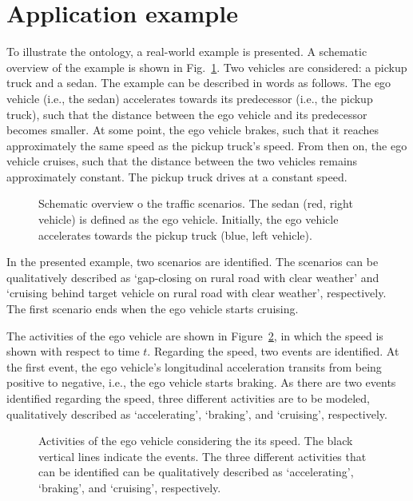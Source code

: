 \section{Application example}
\label{sec:example}

To illustrate the ontology, a real-world example is presented. A schematic overview of the example is shown in Fig.~\ref{fig:example schematic}. Two vehicles are considered: a pickup truck and a sedan. The example can be described in words as follows. The ego vehicle (i.e., the sedan) accelerates towards its predecessor (i.e., the pickup truck), such that the distance between the ego vehicle and its predecessor becomes smaller. At some point, the ego vehicle brakes, such that it reaches approximately the same speed as the pickup truck's speed. From then on, the ego vehicle cruises, such that the distance between the two vehicles remains approximately constant. The pickup truck drives at a constant speed.

\begin{figure}
	\centering
	\setlength\figureheight{121pt}
	\setlength\figurewidth{260pt}
	
	\caption{Schematic overview o the traffic scenarios. The sedan (red, right vehicle) is defined as the ego vehicle. Initially, the ego vehicle accelerates towards the pickup truck (blue, left vehicle).}
	\label{fig:example schematic}
\end{figure}

In the presented example, two scenarios are identified. The scenarios can be qualitatively described as `gap-closing on rural road with clear weather' and `cruising behind target vehicle on rural road with clear weather', respectively. The first scenario ends when the ego vehicle starts cruising. 

The activities of the ego vehicle are shown in Figure~\ref{fig:example ego states}, in which the speed is shown with respect to time $t$. Regarding the speed, two events are identified. At the first event, the ego vehicle's longitudinal acceleration transits from being positive to negative, i.e., the ego vehicle starts braking. As there are two events identified regarding the speed, three different activities are to be modeled, qualitatively described as `accelerating', `braking', and `cruising', respectively. 

\begin{figure}
	\centering
	\setlength\figureheight{130pt}
	\setlength\figurewidth{248pt}
	
	\caption{Activities of the ego vehicle considering the its speed. The black vertical lines indicate the events. The three different activities that can be identified can be qualitatively described as `accelerating', `braking', and `cruising', respectively.}
	\label{fig:example ego states}
\end{figure}

